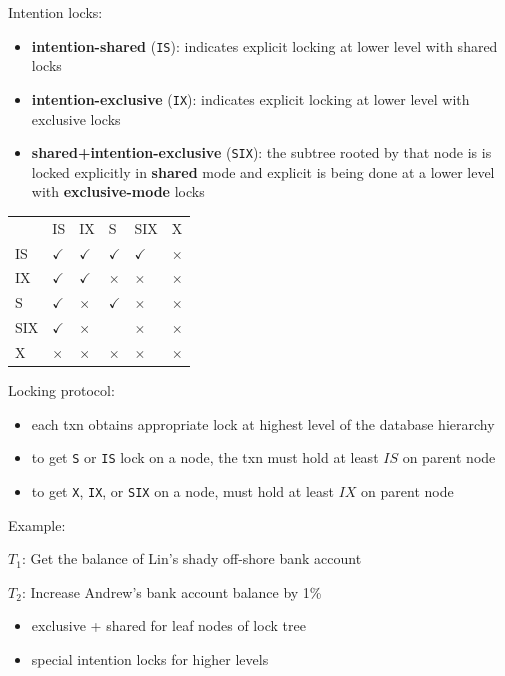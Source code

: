\documentclass[11pt]{article}
\begin{document}
Intention locks:
\begin{itemize}
\item \textbf{intention-shared} (\texttt{IS}): indicates explicit locking at lower level with shared locks
\item \textbf{intention-exclusive} (\texttt{IX}): indicates explicit locking at lower level with exclusive locks
\item \textbf{shared+intention-exclusive} (\texttt{SIX}): the subtree rooted by that node is is locked explicitly in
\textbf{shared} mode and explicit is being done at a lower level with \textbf{exclusive-mode} locks
\end{itemize}

\begin{center}
\begin{tabular}{llllll}
 & IS & IX & S & SIX & X\\
IS & \(\checkmark\) & \(\checkmark\) & \(\checkmark\) & \(\checkmark\) & \(\times\)\\
IX & \(\checkmark\) & \(\checkmark\) & \(\times\) & \(\times\) & \(\times\)\\
S & \(\checkmark\) & \(\times\) & \(\checkmark\) & \(\times\) & \(\times\)\\
SIX & \(\checkmark\) & \(\times\) &  & \(\times\) & \(\times\)\\
X & \(\times\) & \(\times\) & \(\times\) & \(\times\) & \(\times\)\\
\end{tabular}
\end{center}

Locking protocol:
\begin{itemize}
\item each txn obtains appropriate lock at highest level of the database hierarchy
\item to get \texttt{S} or \texttt{IS} lock on a node, the txn must hold at least \(IS\)  on parent node
\item to get \texttt{X}, \texttt{IX}, or \texttt{SIX} on a node, must hold at least \(IX\) on parent node
\end{itemize}

Example:

\(T_1\): Get the balance of Lin's shady off-shore bank account

\(T_2\): Increase Andrew's bank account balance by 1\%

\begin{itemize}
\item exclusive + shared for leaf nodes of lock tree
\item special intention locks for higher levels
\end{itemize}
\end{document}
